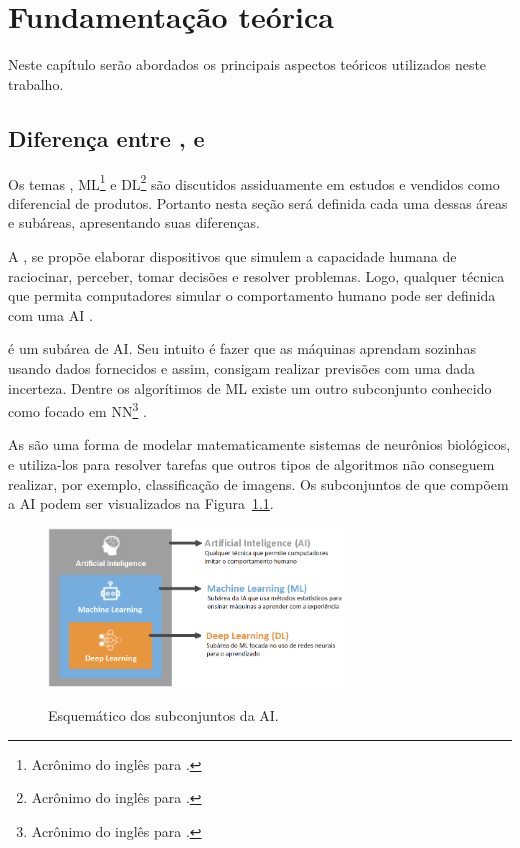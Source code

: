 \chapter{Fundamentação teórica}\label{cap:fundteo}
    Neste capítulo serão abordados os principais aspectos teóricos utilizados neste trabalho.

    \section{Diferença entre \ia, \am e \ap}
    
        Os temas \ia, \gls{ML}\footnote{Acrônimo do inglês para \ml.} e \gls{DL}\footnote{Acrônimo do inglês para \dl.} são discutidos assiduamente em estudos e vendidos como diferencial de produtos. Portanto nesta seção será definida cada uma dessas áreas e subáreas, apresentando suas diferenças. %
    
        A \ia, se propõe elaborar dispositivos que simulem a capacidade humana de raciocinar, perceber, tomar decisões e resolver problemas. Logo, qualquer técnica que permita computadores simular o comportamento humano pode ser definida com uma AI \cite{DeepLearningArtigo}. 
    
        \am é um subárea de AI. Seu intuito é fazer que as máquinas aprendam sozinhas usando dados fornecidos e assim, consigam realizar previsões com uma dada incerteza. Dentre os algorítimos de ML existe um outro subconjunto conhecido como \ap\textit{ }focado em \gls{NN}\footnote{Acrônimo do inglês para \nn.} \cite{kim2017matlab} .  
        
        As \rns\textit{ }são uma forma de modelar matematicamente sistemas de neurônios biológicos, e utiliza-los para resolver tarefas que outros tipos de algoritmos não conseguem realizar, por exemplo, classificação de imagens. Os subconjuntos de que compõem a AI podem ser visualizados na Figura~\ref{fig:AI_Ml_DL}.
            
        \begin{figure}[H]
            \centering
            \caption{Esquemático dos subconjuntos da AI.}
            \includegraphics[width=0.7\textwidth]{fig/2-fundamentacao/diferenca_AI_ML_DL/Areas.png}
            \label{fig:AI_Ml_DL}
        \end{figure}
        
